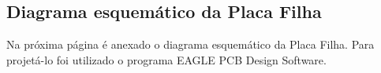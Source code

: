 \documentclass[
	12pt,				%
	openright,			%
	twoside,			%
	a4paper,			%
	english,			%
	french,				%
	spanish,			%
	brazil				%
	]{abntex2}
\begin{document}
\begin{apendicesenv}

\partapendices

\chapter{Diagrama esquemático da Placa Filha}

Na próxima página é anexado o diagrama esquemático da Placa Filha. Para projetá-lo foi utilizado o programa EAGLE PCB Design Software.



\end{apendicesenv}

\iffalse


\begin{anexosenv}

\partanexos

\chapter{Morbi ultrices rutrum lorem.}
\lipsum[30]

\chapter{Cras non urna sed feugiat cum sociis natoque penatibus et magnis dis
parturient montes nascetur ridiculus mus}

\lipsum[31]

\chapter{Fusce facilisis lacinia dui}

\lipsum[32]

\end{anexosenv}

\fi

\printindex


\end{document}
